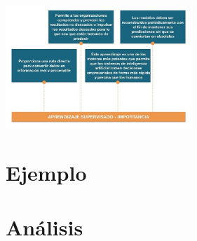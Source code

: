 \documentclass[%
 reprint,
 amsmath,amssymb,
 aps,
]{revtex4-1}
\begin{document}
 \begin{center}
\includegraphics[width=7cm]{./Imagenes/importancia}
\end{center}



\section{Ejemplo}

\section{Análisis}
\end{document}
